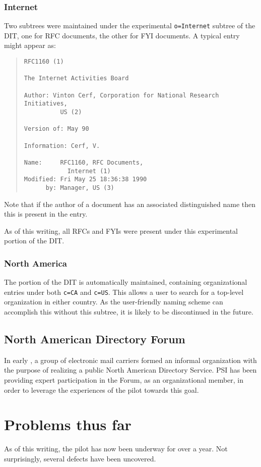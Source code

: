 \subsubsection	{Internet}
Two subtrees were maintained under the experimental \verb"o=Internet" subtree
of the DIT,
one for RFC documents,
the other for FYI documents.
A typical entry might appear as:
\begin{quote}\small\begin{verbatim}
RFC1160 (1)

The Internet Activities Board

Author: Vinton Cerf, Corporation for National Research Initiatives,
          US (2)

Version of: May 90

Information: Cerf, V.

Name:     RFC1160, RFC Documents,
            Internet (1)
Modified: Fri May 25 18:36:38 1990
      by: Manager, US (3)
\end{verbatim}\end{quote}
Note that if the author of a document has an associated distinguished name
then this is present in the entry.

As of this writing,
all RFCs and FYIs were present under this experimental portion of the DIT.

\subsubsection	{North America}
The portion of the DIT is automatically maintained,
containing organizational entries under both \verb"c=CA" and \verb"c=US".
This allows a user to search for a top-level organization in either country.
As the user-friendly naming scheme can accomplish this without this subtree,
it is likely to be discontinued in the future.

\subsection	{North American Directory Forum}
In early {},
a group of electronic mail carriers formed an informal organization
with the purpose of realizing a public North American Directory Service.
PSI has been providing expert participation in the Forum,
as an organizational member,
in order to leverage the experiences of the pilot towards this goal.

\newpage
\section	{Problems thus far}
As of this writing,
the pilot has now been underway for over a year.
Not surprisingly,
several defects have been uncovered.

